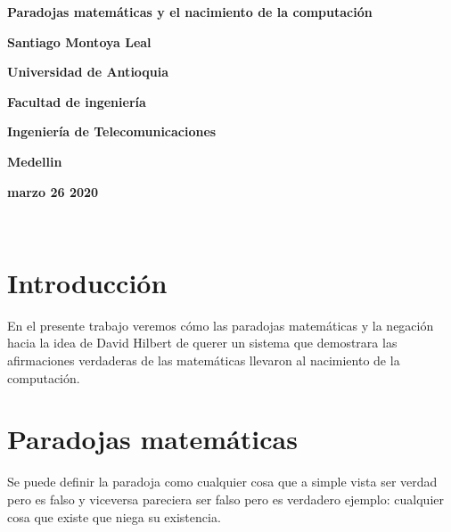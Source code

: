 \documentclass{article}
\begin{document}
\begin{center}
\bf{\sc\Huge Paradojas matemáticas y el nacimiento de la computación}\\
\end{center}
\vspace{80pt}
\begin{center}
\bf{\sc\Huge Santiago Montoya Leal }\\
\end{center}
\vspace{80pt}
\begin{center}
\bf{\sc\Huge Universidad de Antioquia}\\
\end{center}
\vspace{80pt}
\begin{center}
\bf{\sc\Huge Facultad de ingeniería}\\
\end{center}
\vspace{20pt}
\begin{center}
\bf{\sc\Huge Ingeniería de Telecomunicaciones}\\
\end{center}
\vspace{20pt}
\begin{center}
\bf{\sc\Huge Medellin}
\end{center}
\begin{center}
\bf{\sc\Huge marzo 26 2020}\\
\end{center}\
\newpage

\section{Introducción}
\large

En el presente trabajo veremos cómo las paradojas matemáticas y la negación hacia la idea de David Hilbert de querer un sistema que  demostrara las afirmaciones verdaderas de las matemáticas llevaron al nacimiento de la computación.

\section{Paradojas matemáticas}

\large
Se puede definir la paradoja como cualquier cosa que a simple vista ser verdad pero es falso y viceversa  pareciera ser falso pero es verdadero ejemplo: cualquier cosa que existe que niega su existencia.
\end{document}
